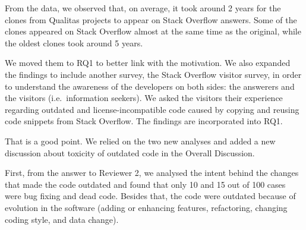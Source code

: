 \documentclass[a4paper,twoside,10pt]{reviewresponse}
\begin{document}
From the data, we observed that, on average, it took around 2 years for the clones from Qualitas projects to appear on Stack Overflow answers. Some of the clones appeared on Stack Overflow almost at the same time as the original, while the oldest clones took around 5 years.


We moved them to RQ1 to better link with the motivation. We also expanded the findings to include another survey, the Stack Overflow visitor survey, in order to understand the awareness of the developers on both sides: the answerers and the visitors (i.e.~information seekers). We asked the visitors their experience regarding outdated and license-incompatible code caused by copying and reusing code snippets from Stack Overflow. The findings are incorporated into RQ1.


That is a good point. We relied on the two new analyses and added a new discussion about toxicity of outdated code in the Overall Discussion. 

First, from the answer to Reviewer 2, we analysed the intent behind the changes that made the code outdated and found that only 10 and 15 out of 100 cases were bug fixing and dead code. Besides that, the code were outdated because of evolution in the software (adding or enhancing features, refactoring, changing coding style, and data change).
\end{document}
